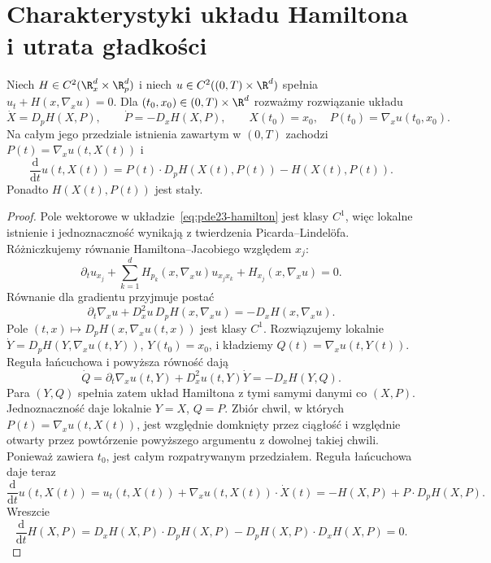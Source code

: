 \section{Charakterystyki układu Hamiltona i utrata gładkości}
\begin{twierdzenie}
\label{thm:pde23-char}
Niech $H\in C^2(\R^d_x\times\R^d_p)$ i niech
$u\in C^2((0,T)\times\R^d)$ spełnia
$u_t+H(x,\nabla_xu)=0$. Dla $(t_0,x_0)\in(0,T)\times\R^d$
rozważmy rozwiązanie układu
\begin{equation}\label{eq:pde23-hamilton}
 \dot X=D_pH(X,P),\qquad \dot P=-D_xH(X,P),
 \qquad X(t_0)=x_0,\quad P(t_0)=\nabla_xu(t_0,x_0).
\end{equation}
Na całym jego przedziale istnienia zawartym w $(0,T)$
zachodzi $P(t)=\nabla_xu(t,X(t))$ i
\begin{equation}\label{eq:pde23-action}
 \frac{\mathrm d}{\mathrm dt}u(t,X(t))
 =P(t)\cdot D_pH(X(t),P(t))-H(X(t),P(t)).
\end{equation}
Ponadto $H(X(t),P(t))$ jest stały.
\end{twierdzenie}
\begin{proof}
Pole wektorowe w układzie~\eqref{eq:pde23-hamilton}
jest klasy $C^1$, więc lokalne istnienie i jednoznaczność
wynikają z twierdzenia Picarda--Lindelöfa.
Różniczkujemy równanie Hamiltona--Jacobiego względem $x_j$:
\[
 \partial_tu_{x_j}+\sum_{k=1}^d H_{p_k}(x,\nabla_xu)u_{x_jx_k}
 +H_{x_j}(x,\nabla_xu)=0.
\]
Równanie dla gradientu przyjmuje postać
\[
 \partial_t\nabla_xu+
 D_x^2u\,D_pH(x,\nabla_xu)=-D_xH(x,\nabla_xu).
\]
Pole $(t,x)\mapsto D_pH(x,\nabla_xu(t,x))$
jest klasy $C^1$. Rozwiązujemy lokalnie
$\dot Y=D_pH(Y,\nabla_xu(t,Y))$, $Y(t_0)=x_0$,
i kładziemy $Q(t)=\nabla_xu(t,Y(t))$.
Reguła łańcuchowa i powyższa równość dają
\[
 \dot Q=\partial_t\nabla_xu(t,Y)+D_x^2u(t,Y)\dot Y
       =-D_xH(Y,Q).
\]
Para $(Y,Q)$ spełnia zatem układ Hamiltona
z tymi samymi danymi co $(X,P)$.
Jednoznaczność daje lokalnie $Y=X$, $Q=P$.
Zbiór chwil, w których $P(t)=\nabla_xu(t,X(t))$,
jest względnie domknięty przez ciągłość i względnie
otwarty przez powtórzenie powyższego argumentu
z dowolnej takiej chwili. Ponieważ zawiera $t_0$,
jest całym rozpatrywanym przedziałem.
Reguła łańcuchowa daje teraz
\[
 \frac{\mathrm d}{\mathrm dt}u(t,X(t))
 =u_t(t,X(t))+\nabla_xu(t,X(t))\cdot\dot X(t)
 =-H(X,P)+P\cdot D_pH(X,P).
\]
Wreszcie
\[
 \frac{\mathrm d}{\mathrm dt}H(X,P)
 =D_xH(X,P)\cdot D_pH(X,P)
 -D_pH(X,P)\cdot D_xH(X,P)=0.
\]
\end{proof}

